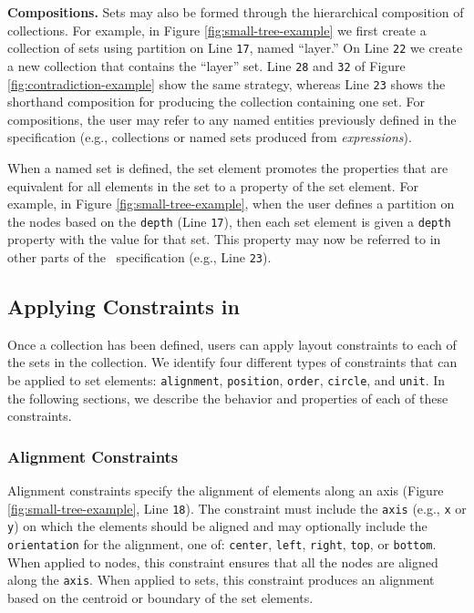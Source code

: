 \textbf{Compositions.} Sets may also be formed through the hierarchical
composition of collections. For example, in Figure
\ref{fig:small-tree-example} we first create a collection of sets using
partition on Line \texttt{17}, named ``layer.'' On Line \texttt{22} we
create a new collection that contains the ``layer'' set. Line \texttt{28}
and \texttt{32} of Figure \ref{fig:contradiction-example} show the same
strategy, whereas Line \texttt{23} shows the shorthand composition for
producing the collection containing one set. For compositions, the user may
refer to any named entities previously defined in the specification (e.g.,
collections or named sets produced from \emph{expressions}).


When a named set is defined, the set element promotes the properties that
are equivalent for all elements in the set to a property of the set
element. For example, in Figure \ref{fig:small-tree-example}, when the user
defines a partition on the nodes based on the \texttt{depth} (Line
\texttt{17}), then each set element is given a \texttt{depth} property with
the value for that set. This property may now be referred to in other parts
of the \projectname\ specification (e.g., Line \texttt{23}).


\subsection{Applying Constraints in \projectname}
\label{sec:constraints}
Once a collection has been defined, users can apply layout constraints to
each of the sets in the collection. We identify four different types of
constraints that can be applied to set elements: \texttt{alignment},
\texttt{position}, \texttt{order}, \texttt{circle}, and \texttt{unit}. In
the following sections, we describe the behavior and properties of each of
these constraints.


\subsubsection{Alignment Constraints}
 Alignment constraints
specify the alignment of elements along an axis (Figure
\ref{fig:small-tree-example}, Line \texttt{18}). The constraint must
include the \texttt{axis} (e.g., \texttt{x} or \texttt{y}) on which the
elements should be aligned and may optionally include the
\texttt{orientation} for the alignment, one of: \texttt{center},
\texttt{left}, \texttt{right}, \texttt{top}, or \texttt{bottom}. When
applied to nodes, this constraint ensures that all the nodes are aligned
along the \texttt{axis}. When applied to sets, this constraint produces an
alignment based on the centroid or boundary of the set elements.

